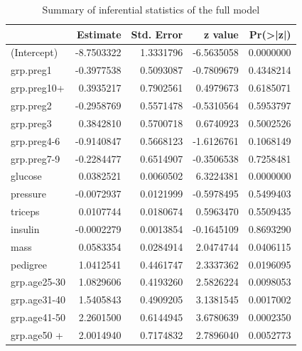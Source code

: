 \documentclass[
]{book}
\newenvironment{Shaded}{\begin{snugshade}}{\end{snugshade}}
\newcommand{\AttributeTok}[1]{\textcolor[rgb]{0.13,0.29,0.53}{#1}}
\newcommand{\CommentTok}[1]{\textcolor[rgb]{0.56,0.35,0.01}{\textit{#1}}}
\newcommand{\FunctionTok}[1]{\textcolor[rgb]{0.13,0.29,0.53}{\textbf{#1}}}
\newcommand{\NormalTok}[1]{#1}
\newcommand{\OtherTok}[1]{\textcolor[rgb]{0.56,0.35,0.01}{#1}}
\newcommand{\SpecialCharTok}[1]{\textcolor[rgb]{0.81,0.36,0.00}{\textbf{#1}}}
\newcommand{\StringTok}[1]{\textcolor[rgb]{0.31,0.60,0.02}{#1}}
\begin{document}
\begin{table}

\caption{\label{tab:unnamed-chunk-134}Summary of inferential statistics of the full model}
\centering
\begin{tabular}[t]{l|r|r|r|r}
\hline
  & Estimate & Std. Error & z value & Pr(>|z|)\\
\hline
(Intercept) & -8.7503322 & 1.3331796 & -6.5635058 & 0.0000000\\
\hline
grp.preg1 & -0.3977538 & 0.5093087 & -0.7809679 & 0.4348214\\
\hline
grp.preg10+ & 0.3935217 & 0.7902561 & 0.4979673 & 0.6185071\\
\hline
grp.preg2 & -0.2958769 & 0.5571478 & -0.5310564 & 0.5953797\\
\hline
grp.preg3 & 0.3842810 & 0.5700718 & 0.6740923 & 0.5002526\\
\hline
grp.preg4-6 & -0.9140847 & 0.5668123 & -1.6126761 & 0.1068149\\
\hline
grp.preg7-9 & -0.2284477 & 0.6514907 & -0.3506538 & 0.7258481\\
\hline
glucose & 0.0382521 & 0.0060502 & 6.3224381 & 0.0000000\\
\hline
pressure & -0.0072937 & 0.0121999 & -0.5978495 & 0.5499403\\
\hline
triceps & 0.0107744 & 0.0180674 & 0.5963470 & 0.5509435\\
\hline
insulin & -0.0002279 & 0.0013854 & -0.1645109 & 0.8693290\\
\hline
mass & 0.0583354 & 0.0284914 & 2.0474744 & 0.0406115\\
\hline
pedigree & 1.0412541 & 0.4461747 & 2.3337362 & 0.0196095\\
\hline
grp.age25-30 & 1.0829606 & 0.4193260 & 2.5826224 & 0.0098053\\
\hline
grp.age31-40 & 1.5405843 & 0.4909205 & 3.1381545 & 0.0017002\\
\hline
grp.age41-50 & 2.2601500 & 0.6144945 & 3.6780639 & 0.0002350\\
\hline
grp.age50 + & 2.0014940 & 0.7174832 & 2.7896040 & 0.0052773\\
\hline
\end{tabular}
\end{table}

\begin{Shaded}
\end{Shaded}
\end{document}
